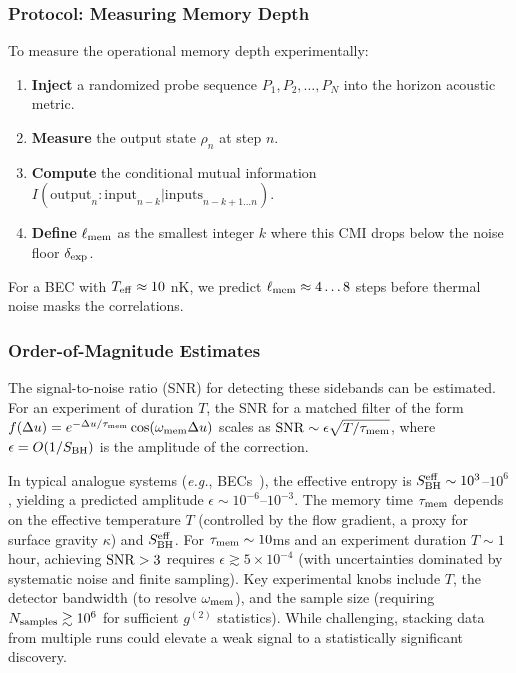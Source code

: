 \documentclass[aps,prd,preprint,onecolumn,superscriptaddress,nofootinbib,longbibliography,floatfix,11pt,showpacs,showkeys]{revtex4-2}
\newcommand{\eg}{\textit{e.g.}\xspace}
\theoremstyle{plain}
\theoremstyle{definition}
\theoremstyle{remark}
\begin{document}
\subsubsection{Protocol: Measuring Memory Depth}
To measure the operational memory depth experimentally:
\begin{enumerate}
    \item \textbf{Inject} a randomized probe sequence $P_1, P_2, \dots, P_N$ into the horizon acoustic metric.
    \item \textbf{Measure} the output state $\rho_n$ at step $n$.
    \item \textbf{Compute} the conditional mutual information $I(\text{output}_n : \text{input}_{n-k} | \text{inputs}_{n-k+1 \dots n})$.
    \item \textbf{Define} $\ell_{\rm mem}$ as the smallest integer $k$ where this CMI drops below the noise floor $\delta_{\rm exp}$.
\end{enumerate}
For a BEC with $T_{\rm eff} \approx 10$ nK, we predict $\ell_{\rm mem} \approx 4\dots 8$ steps before thermal noise masks the correlations.

\subsubsection{Order-of-Magnitude Estimates}
The signal-to-noise ratio (SNR) for detecting these sidebands can be estimated. For an experiment of duration $T$, the SNR for a matched filter of the form $f(\Delta u) = e^{-\Delta u/\tau_{\rm mem}}\cos(\omega_{\rm mem}\Delta u)$ scales as ${\rm SNR}\sim \epsilon\sqrt{T/\tau_{\rm mem}}$, where $\epsilon=O(1/S_{\rm BH})$ is the amplitude of the correction.

In typical analogue systems (\eg, BECs~\cite{Steinhauer:2016}), the effective entropy is $S_{\rm BH}^{\rm eff} \sim 10^3$--$10^6$, yielding a predicted amplitude $\epsilon \sim 10^{-6}$--$10^{-3}$. The memory time $\tau_{\rm mem}$ depends on the effective temperature $T$ (controlled by the flow gradient, a proxy for surface gravity $\kappa$) and $S_{\rm BH}^{\rm eff}$. For $\tau_{\rm mem} \sim 10$ms and an experiment duration $T \sim 1$ hour, achieving ${\rm SNR} > 3$ requires $\epsilon \gtrsim 5\times 10^{-4}$ (with uncertainties dominated by systematic noise and finite sampling). Key experimental knobs include $T$, the detector bandwidth (to resolve $\omega_{\rm mem}$), and the sample size (requiring $N_{\rm samples} \gtrsim 10^6$ for sufficient $g^{(2)}$ statistics). While challenging, stacking data from multiple runs could elevate a weak signal to a statistically significant discovery.
\end{document}
